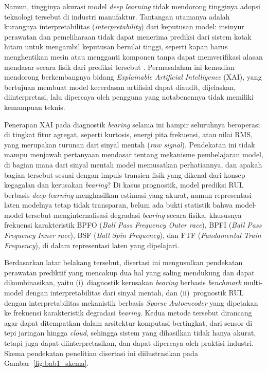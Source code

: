 Namun, tingginya akurasi model \emph{deep learning} tidak mendorong tingginya adopsi teknologi tersebut di industri manufaktur.
Tantangan utamanya adalah kurangnya interpretabilitas (\emph{interpretability})
dari keputusan model: insinyur perawatan dan pemeliharaan tidak dapat menerima prediksi dari
sistem kotak hitam untuk mengambil keputusan bernilai tinggi, seperti
kapan harus menghentikan mesin atau mengganti komponen tanpa dapat memverifikasi
alasan mendasar secara fisik dari prediksi tersebut .
Permasalahan ini kemudian mendorong berkembangnya bidang \emph{Explainable
Artificial Intelligence} (XAI), yang bertujuan membuat model kecerdasan
artifisial dapat diaudit, dijelaskan, diinterpretasi, lalu dipercaya oleh pengguna yang notabenennya tidak memiliki kemampuan teknis.

Penerapan XAI pada diagnostik \emph{bearing} selama ini hampir seluruhnya
beroperasi di tingkat fitur agregat, seperti kurtosis, energi pita
frekuensi, atau nilai RMS, yang merupakan turunan dari sinyal mentah (\emph{raw signal}).
Pendekatan ini tidak mampu menjawab pertanyaan mendasar tentang mekanisme
pembelajaran model, di bagian mana dari sinyal mentah model memusatkan
perhatiannya, dan apakah bagian tersebut sesuai dengan impuls transien
fisik yang dikenal dari konsep kegagalan dan kerusakan \emph{bearing}?
Di kasus prognostik, model prediksi RUL berbasis \emph{deep learning}
menghasilkan estimasi yang akurat, namun representasi laten modelnya tetap tidak
transparan, belum ada bukti statistik bahwa model-model tersebut
menginternalisasi degradasi \emph{bearing} secara fisika, khususnya frekuensi
karakteristik BPFO (\emph{Ball Pass Frequency Outer race}), BPFI
(\emph{Ball Pass Frequency Inner race}), BSF (\emph{Ball Spin Frequency}),
dan FTF (\emph{Fundamental Train Frequency}), di dalam representasi laten
yang dipelajari.

Berdasarkan latar belakang tersebut, disertasi ini mengusulkan pendekatan
perawatan prediktif yang mencakup {\color{blue}dua hal} yang saling mendukung dan dapat
dikombinasikan, yaitu {\color{blue}(i)}~diagnostik kerusakan \emph{bearing} berbasis
\emph{benchmark} multi-model dengan interpretabilitas dari sinyal mentah, dan
{\color{blue}(ii)}~prognostik RUL dengan interpretabilitas mekanistik berbasis
\emph{Sparse Autoencoder} yang dipetakan ke frekuensi karakteristik
degradasi \emph{bearing}.
{\color{blue}Kedua metode tersebut} dirancang agar dapat ditempatkan dalam arsitektur komputasi
bertingkat, dari sensor di tepi jaringan hingga \emph{cloud}, sehingga
sistem yang dihasilkan tidak hanya akurat, tetapi juga dapat diinterpretasikan, dan dapat
dipercaya oleh praktisi industri.
Skema pendekatan penelitian disertasi ini diilustrasikan pada
Gambar~\ref{fig:bab1_skema}.

